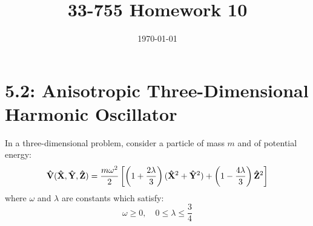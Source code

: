 \documentclass[a4paper,twoside]{article}
\title{33-755 Homework 10}
\date{\today}
\begin{document}
\maketitle

\section*{5.2: Anisotropic Three-Dimensional Harmonic Oscillator}
\label{sec:anisotropic_three-dimensional_harmonic_oscillator}

In a three-dimensional problem, consider a particle of mass $ m $ and of potential energy:
\begin{equation}
    \vu{V}(\vu{X},\vu{Y},\vu{Z}) = \frac{m \omega^2}{2} \left[ \left( 1 + \frac{2 \lambda}{3} \right)(\vu{X}^2 + \vu{Y}^2) + \left( 1 - \frac{4 \lambda}{3} \right)\vu{Z}^2 \right]
\end{equation}
where $ \omega $ and $\lambda$ are constants which satisfy:
\begin{equation}
    \omega \geq 0,\quad 0 \leq \lambda \leq \frac{3}{4}
\end{equation}
\end{document}
